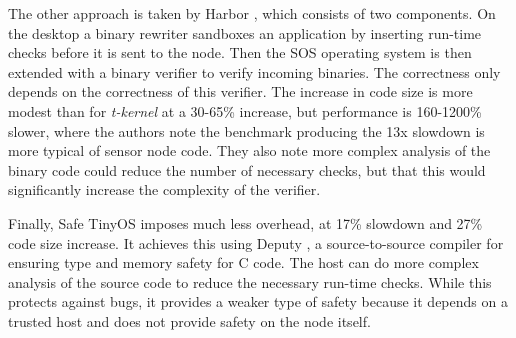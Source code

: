 The other approach is taken by Harbor \cite{Kumar:2007ge}, which consists of two components. On the desktop a binary rewriter sandboxes an application by inserting run-time checks before it is sent to the node. Then the SOS operating system is then extended with a binary verifier to verify incoming binaries. The correctness only depends on the correctness of this verifier. The increase in code size is more modest than for \emph{t-kernel} at a 30-65\% increase, but performance is 160-1200\% slower, where the authors note the benchmark producing the 13x slowdown is more typical of sensor node code. They also note more complex analysis of the binary code could reduce the number of necessary checks, but that this would significantly increase the complexity of the verifier.

Finally, Safe TinyOS \cite{Cooprider:2007ub} imposes much less overhead, at 17\% slowdown and 27\% code size increase. It achieves this using Deputy \cite{Condit:2007uo}, a source-to-source compiler for ensuring type and memory safety for C code. The host can do more complex analysis of the source code to reduce the necessary run-time checks. While this protects against bugs, it provides a weaker type of safety because it depends on a trusted host and does not provide safety on the node itself.
